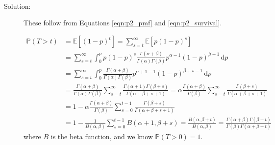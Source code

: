 \documentclass[letterpaper,11pt]{article}
\begin{document}
\begin{enumerate}
\begin{enumerate}
      \begin{description}
      \item[Solution:] These follow from Equations
        \ref{eqn:p2_pmf} and \ref{eqn:p2_survival}.

        \begin{align}
          \mathbb{P}\left(T > t\right)          
          &= \mathbb{E}\left[
            (1 - p)^t
            \right]
            = \sum_{s=t}^\infty
            \mathbb{E}\left[
            p\left(1 - p\right)^s
            \right] \label{eqn:p2_survival_beta}\\
          &=
            \sum_{s=t}^\infty
            \int_0^p
            p\left(1-p\right)^s
            \frac{\Gamma\left(\alpha + \beta\right)}            
            {\Gamma\left(\alpha\right)\Gamma\left(\beta\right)}
            p^{\alpha - 1}\left(1-p\right)^{\beta-1}
            \,\mathrm{d}p
          \nonumber\\
          &= \sum_{s=t}^\infty
            \int_0^p
            \frac{\Gamma\left(\alpha + \beta\right)}
            {\Gamma\left(\alpha\right)\Gamma\left(\beta\right)}
            p^{\alpha + 1 - 1}\left(1-p\right)^{\beta + s -1}
            \,\mathrm{d}p \nonumber\\
          &= \frac{\Gamma\left(\alpha + \beta\right)} 
            {\Gamma\left(\alpha\right)\Gamma\left(\beta\right)}            
            \sum_{s=t}^\infty
            \frac
            {\Gamma\left(\alpha + 1\right)\Gamma\left(\beta + s\right)}
            {\Gamma\left(\alpha + \beta + s + 1\right)}
            = \alpha\frac{\Gamma\left(\alpha + \beta\right)} 
            {\Gamma\left(\beta\right)}
            \sum_{s=t}^\infty
            \frac
            {\Gamma\left(\beta + s\right)}
            {\Gamma\left(\alpha + \beta + s + 1\right)}
          \nonumber\\
          &= 
            1
            - \alpha
            \frac{\Gamma\left(\alpha + \beta\right)} 
            {\Gamma\left(\beta\right)}
            \sum_{s=0}^{t-1}
            \frac
            {\Gamma\left(\beta + s\right)}
            {\Gamma\left(\alpha + \beta + s + 1\right)} \nonumber\\
          &= 1 - \frac{1}{B\left(\alpha,\beta\right)}
            \sum_{s=0}^{t-1} B\left(\alpha + 1, \beta + s\right)
            = \frac{B\left(\alpha,\beta + t\right)}{B\left(\alpha,\beta\right)}
            = \frac{\Gamma\left(\alpha + \beta\right)\Gamma\left(\beta + t\right)}
            {\Gamma\left(\beta\right)\Gamma\left(\alpha + \beta + t\right)}
            \nonumber
        \end{align}
        where $B$ is the beta function, and we know
        $\mathbb{P}\left(T > 0\right) = 1$.


\end{description}
\end{enumerate}
\end{enumerate}
\end{document}
